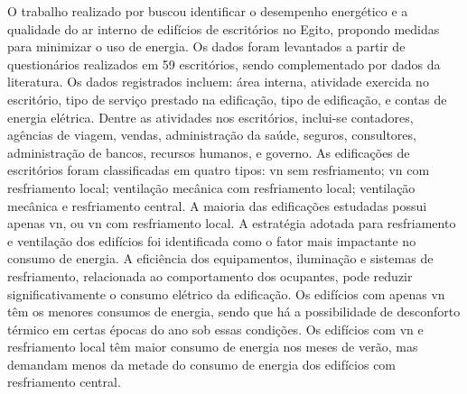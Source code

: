 \documentclass[brazil,hardcopy,openany]{ufscthesis} %
\begin{document}
O trabalho realizado por  buscou identificar o desempenho energético e a qualidade do ar interno de edifícios de escritórios no Egito, propondo medidas para minimizar o uso de energia. Os dados foram levantados a partir de questionários realizados em 59 escritórios, sendo complementado por dados da literatura. Os dados registrados incluem: área interna, atividade exercida no escritório, tipo de serviço prestado na edificação, tipo de edificação, e contas de energia elétrica. Dentre as atividades nos escritórios, inclui-se contadores, agências de viagem, vendas, administração da saúde, seguros, consultores, administração de bancos, recursos humanos, e governo. As edificações de escritórios foram classificadas em quatro tipos: \acrshort{vn} sem resfriamento; \acrshort{vn} com resfriamento local; ventilação mecânica com resfriamento local; ventilação mecânica e resfriamento central. A maioria das edificações estudadas possui apenas \acrlong{vn}, ou \acrshort{vn} com resfriamento local. A estratégia adotada para resfriamento e ventilação dos edifícios foi identificada como o fator mais impactante no consumo de energia. A eficiência dos equipamentos, iluminação e sistemas de resfriamento, relacionada ao comportamento dos ocupantes, pode reduzir significativamente o consumo elétrico da edificação. 
Os edifícios com apenas \acrshort{vn} têm os menores consumos de energia, sendo que há a possibilidade de desconforto térmico em certas épocas do ano sob essas condições. Os edifícios com \acrshort{vn} e resfriamento local têm maior consumo de energia nos meses de verão, mas demandam menos da metade do consumo de energia dos edifícios com resfriamento central.
\end{document}
